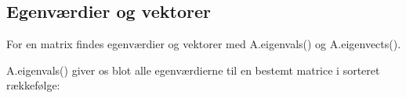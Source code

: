 \documentclass[letterpaper,10pt,english]{jupyterBook}
\begin{document}
\begin{sphinxVerbatim}[commandchars=\\\{\}]
  \PYG{p}{[}  \PYG{p}{]}
  \PYG{p}{[}  \PYG{p}{]}
 

\end{sphinxVerbatim}

\noindent{}

\noindent{}

\noindent{}


\subsection{Egenværdier og \sphinxhyphen{}vektorer}
\label{\detokenize{notebooks/sympy/Notebook_LinAlg_2:egenvaerdier-og-vektorer}}
For en matrix findes egenværdier og \sphinxhyphen{}vektorer med A.eigenvals() og A.eigenvects().

A.eigenvals() giver os blot alle egenværdierne til en bestemt matrice i sorteret rækkefølge:

\begin{sphinxVerbatim}[commandchars=\\\{\}]
  \PYG{p}{[}\PYG{p}{[}  \PYG{p}{]} \PYG{p}{[}  \PYG{p}{]} \PYG{p}{[}  \PYG{p}{]}\PYG{p}{]}
\end{sphinxVerbatim}

\noindent{}

\begin{sphinxVerbatim}[commandchars=\\\{\}]
\end{sphinxVerbatim}
\end{document}
